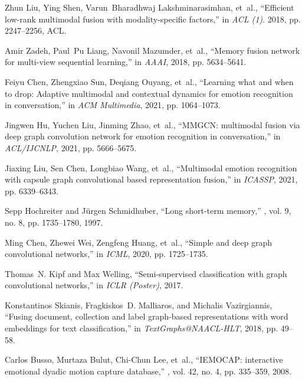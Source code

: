\begin{thebibliography}{10}
  Zhun Liu, Ying Shen, Varun~Bharadhwaj Lakshminarasimhan, et~al.,
  \newblock ``Efficient low-rank multimodal fusion with modality-specific
    factors,''
  \newblock in {\em {ACL} {(1)}}. 2018, pp. 2247--2256, ACL.
  
  Amir Zadeh, Paul~Pu Liang, Navonil Mazumder, et~al.,
  \newblock ``Memory fusion network for multi-view sequential learning,''
  \newblock in {\em {AAAI}}, 2018, pp. 5634--5641.
  
  Feiyu Chen, Zhengxiao Sun, Deqiang Ouyang, et~al.,
  \newblock ``Learning what and when to drop: Adaptive multimodal and contextual
    dynamics for emotion recognition in conversation,''
  \newblock in {\em {ACM} Multimedia}, 2021, pp. 1064--1073.
  
  Jingwen Hu, Yuchen Liu, Jinming Zhao, et~al.,
  \newblock ``{MMGCN:} multimodal fusion via deep graph convolution network for
    emotion recognition in conversation,''
  \newblock in {\em {ACL/IJCNLP}}, 2021, pp. 5666--5675.
  
  Jiaxing Liu, Sen Chen, Longbiao Wang, et~al.,
  \newblock ``Multimodal emotion recognition with capsule graph convolutional
    based representation fusion,''
  \newblock in {\em {ICASSP}}, 2021, pp. 6339--6343.
  
  Sepp Hochreiter and J{\"{u}}rgen Schmidhuber,
  \newblock ``Long short-term memory,''
  , vol. 9, no. 8, pp. 1735--1780, 1997.
  
  Ming Chen, Zhewei Wei, Zengfeng Huang, et~al.,
  \newblock ``Simple and deep graph convolutional networks,''
  \newblock in {\em {ICML}}, 2020, pp. 1725--1735.
  
  Thomas~N. Kipf and Max Welling,
  \newblock ``Semi-supervised classification with graph convolutional networks,''
  \newblock in {\em {ICLR} (Poster)}, 2017.
  
  Konstantinos Skianis, Fragkiskos~D. Malliaros, and Michalis Vazirgiannis,
  \newblock ``Fusing document, collection and label graph-based representations
    with word embeddings for text classification,''
  \newblock in {\em TextGraphs@NAACL-HLT}, 2018, pp. 49--58.
  
  Carlos Busso, Murtaza Bulut, Chi{-}Chun Lee, et~al.,
  \newblock ``{IEMOCAP:} interactive emotional dyadic motion capture database,''
  , vol. 42, no. 4, pp. 335--359, 2008.
  

\end{thebibliography}
